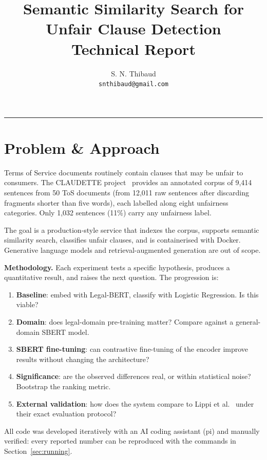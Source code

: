 \documentclass[11pt,a4paper]{article}
\title{Semantic Similarity Search for Unfair Clause Detection\\\large Technical Report}
\author{S. N. Thibaud\\\small\texttt{snthibaud@gmail.com}}
\date{}
\begin{document}
\maketitle

\begin{center}\rule{0.5\linewidth}{0.5pt}\end{center}

\section{Problem \& Approach}

Terms of Service documents routinely contain clauses that may be unfair
to consumers.  The CLAUDETTE project~\cite{lippi2019claudette} provides
an annotated corpus of 9,414 sentences from 50 ToS documents (from 12,011
raw sentences after discarding fragments shorter than five words), each
labelled along eight unfairness categories.  Only 1,032 sentences (11\%)
carry any unfairness label.

The goal is a production-style service that indexes the corpus,
supports semantic similarity search, classifies unfair clauses,
and is containerised with Docker.  Generative language models and
retrieval-augmented generation are out of scope.

\textbf{Methodology.}  Each experiment tests a specific hypothesis,
produces a quantitative result, and raises the next question.  The
progression is:

\begin{enumerate}
\item \textbf{Baseline}: embed with Legal-BERT, classify with Logistic
  Regression.  Is this viable?
\item \textbf{Domain}: does legal-domain pre-training matter?  Compare
  against a general-domain SBERT model.
\item \textbf{SBERT fine-tuning}: can contrastive fine-tuning of the
  encoder improve results without changing the architecture?
\item \textbf{Significance}: are the observed differences real, or within
  statistical noise?  Bootstrap the ranking metric.
\item \textbf{External validation}: how does the system compare to Lippi
  et al.~\cite{lippi2019claudette} under their exact evaluation protocol?
\end{enumerate}

All code was developed iteratively with an AI coding assistant (pi) and
manually verified: every reported number can be reproduced with the
commands in Section~\ref{sec:running}.
\end{document}
